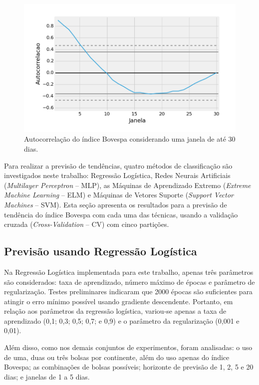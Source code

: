\documentclass[12pt,a4paper,utf8]{ppgsi}
\begin{document}
            \begin{figure}[H]
            \centering
            \includegraphics[width=12cm]{autocorrelacao.png}
            \caption{Autocorrelação do índice Bovespa considerando uma janela de até 30 dias.}
            \label{fig:autocorr}
            \end{figure}

        Para realizar a previsão de tendências, quatro métodos de classificação são investigados neste trabalho: Regressão Logística, Redes Neurais Artificiais (\textit{Multilayer Perceptron} -- MLP), as Máquinas de Aprendizado Extremo (\textit{Extreme Machine Learning} -- ELM) e Máquinas de Vetores Suporte (\textit{Support Vector Machines} -- SVM). Esta seção apresenta os resultados para a previsão de tendência do índice Bovespa com cada uma das técnicas, usando a validação cruzada (\textit{Cross-Validation} -- CV) com cinco partições.

        \subsection{Previsão usando Regressão Logística}

        Na Regressão Logística implementada para este trabalho, apenas três parâmetros são considerados: taxa de aprendizado, número máximo de épocas e parâmetro de regularização. Testes preliminares indicaram que 2000 épocas são suficientes para atingir o erro mínimo possível usando gradiente descendente. Portanto, em relação aos parâmetros da regressão logística, variou-se apenas a taxa de aprendizado (0,1; 0,3; 0,5; 0,7; e 0,9) e o parâmetro da regularização (0,001 e 0,01).

            Além disso, como nos demais conjuntos de experimentos, foram analisadas: o uso de uma, duas ou três bolsas por continente, além do uso apenas do índice Bovespa; as combinações de bolsas possíveis; horizonte de previsão de 1, 2, 5 e 20 dias; e janelas de 1 a 5 dias.
\end{document}
